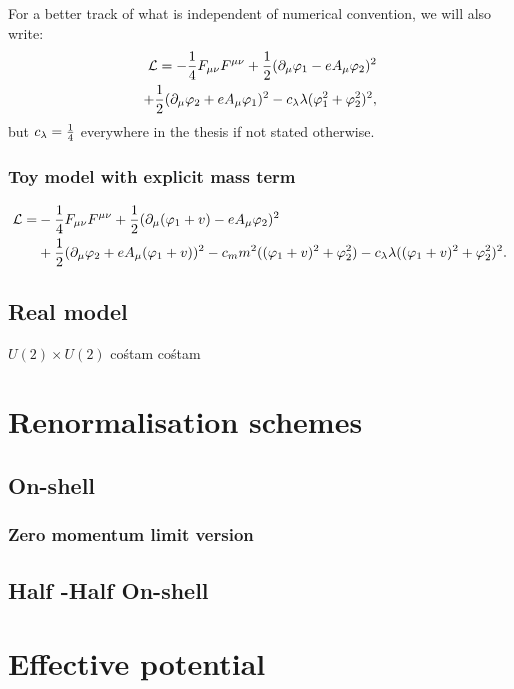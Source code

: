 For a better track of what is independent of numerical convention, we will also write:
\begin{align}\label{toy_model}
\mathcal{L} = -\frac{1}{4}F_{\mu\nu}F^{\mu\nu}+ 
\frac{1}{2}(\partial_\mu\varphi_1 - eA_\mu\varphi_2)^2\\
+\frac{1}{2}(\partial_\mu\varphi_2+eA_\mu\varphi_1)^2
-c_\lambda\lambda(\varphi_1^2+\varphi_2^2)^2, \notag
\end{align}
but $c_\lambda = \frac{1}{4}$ everywhere in the thesis if not stated otherwise.
\subsubsection{Toy model with explicit mass term}
\begin{align}\label{mass_term_lagrangian_int}
\mathcal{L} = &-\frac{1}{4}F_{\mu\nu}F^{\mu\nu}+ 
\frac{1}{2}(\partial_\mu(\varphi_1+v) - eA_\mu\varphi_2)^2\\
&+\frac{1}{2}(\partial_\mu\varphi_2+eA_\mu(\varphi_1+v))^2 - c_m m^2((\varphi_1+v)^2+\varphi_2^2)
-c_\lambda\lambda((\varphi_1+v)^2+\varphi_2^2)^2. \notag
\end{align}
\subsection{Real model}
$U(2)\times U(2)$ cośtam cośtam

\section{Renormalisation schemes}
\subsection{\MSbar}
\subsection{On-shell}
\subsubsection{Zero momentum limit version}
\subsection{Half \MSbar-Half On-shell}
\section{Effective potential}
